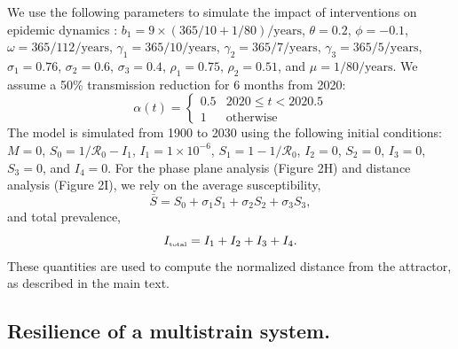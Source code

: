 \documentclass[12pt]{article}
\newcommand{\tsub}[2]{#1_{{\textrm{\tiny #2}}}}
\begin{document}
We use the following parameters to simulate the impact of interventions on epidemic dynamics \citep{pitzer2015environmental}: $b_1 = 9 \times (365/10+1/80)/\mathrm{years}$, $\theta = 0.2$, $\phi = -0.1$, $\omega=365/112/\mathrm{years}$, $\gamma_1=365/10/\mathrm{years}$, $\gamma_2=365/7/\mathrm{years}$, $\gamma_3=365/5/\mathrm{years}$, $\sigma_1 = 0.76$, $\sigma_2 = 0.6$, $\sigma_3 = 0.4$, $\rho_1 = 0.75$, $\rho_2 = 0.51$, and $\mu = 1/80/\mathrm{years}$.
We assume a 50\% transmission reduction for 6 months from 2020:
\begin{equation}
\alpha(t) = \begin{cases}
0.5 & 2020 \leq t< 2020.5\\
1 & \textrm{otherwise}
\end{cases}
\end{equation}
The model is simulated from 1900 to 2030 using the following initial conditions: $M=0$, $S_0=1/\mathcal R_0-I_1$, $I_1=1\times 10^{-6}$, $S_1=1-1/\mathcal R_0$, $I_2=0$, $S_2=0$, $I_3=0$, $S_3=0$, and $I_4=0$.
For the phase plane analysis (Figure 2H) and distance analysis (Figure 2I), we rely on the average susceptibility,
\begin{equation}
\bar{S} = S_0 + \sigma_1 S_1 + \sigma_2 S_2 + \sigma_3 S_3,
\end{equation}
and total prevalence,
\begin{equation}
\tsub{I}{total} = I_1 + I_2 + I_3 + I_4.
\end{equation}
These quantities are used to compute the normalized distance from the attractor, as described in the main text.

\subsection*{Resilience of a multistrain system.}
\end{document}
